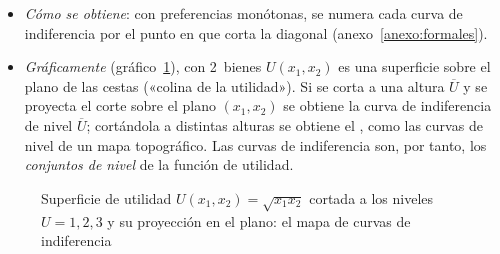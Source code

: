 \documentclass[11pt]{article}
\begin{document}
\begin{itemize}
\begin{itemize}
  \item \emph{Cómo se obtiene}: con preferencias monótonas, se numera cada curva de indiferencia por el punto en que corta la diagonal (anexo~\ref{anexo:formales}).
  \item \emph{Gráficamente} (gráfico~\ref{fig:superficie-utilidad}), con 2~bienes $U(x_1,x_2)$ es una superficie sobre el plano de las cestas («colina de la utilidad»). Si se corta a una altura $\overline{U}$ y se proyecta el corte sobre el plano $(x_1,x_2)$ se obtiene la curva de indiferencia de nivel $\overline{U}$; cortándola a distintas alturas se obtiene el , como las curvas de nivel de un mapa topográfico. Las curvas de indiferencia son, por tanto, los \emph{conjuntos de nivel} de la función de utilidad.
  \end{itemize}
\end{itemize}

\begin{figure}[H]
\centering
\caption{Superficie de utilidad $U(x_1,x_2)=\sqrt{x_1x_2}$ cortada a los niveles $U=1,2,3$ y su proyección en el plano: el mapa de curvas de indiferencia}\label{fig:superficie-utilidad}
\end{figure}
\end{document}
